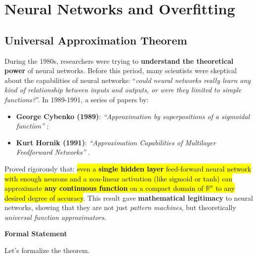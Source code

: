 \section{Neural Networks and Overfitting}

\subsection{Universal Approximation Theorem}

During the 1980s, researchers were trying to \textbf{understand the theoretical power} of neural networks. Before this period, many scientists were skeptical about the capabilities of neural networks: ``\emph{could neural networks really learn any kind of relationship between inputs and outputs, or were they limited to simple functions?}''. In 1989-1991, a series of papers by:
\begin{itemize}
    \item \textbf{George Cybenko (1989)}: \emph{``Approximation by superpositions of a sigmoidal function''} \cite{cybenko1989approximation};
    \item \textbf{Kurt Hornik (1991)}: \emph{``Approximation Capabilities of Multilayer Feedforward Networks''} \cite{hornik1991approximation}.
\end{itemize}
Proved rigorously that: \hl{even a \textbf{single hidden layer} feed-forward neural network with enough neurons and a non-linear activation (like sigmoid or tanh) can approximate \textbf{any continuous function} on a compact domain of $\mathbb{R}^n$ to any desired degree of accuracy}. This result gave \textbf{mathematical legitimacy} to neural networks, showing that they are not just \emph{pattern machines}, but theoretically \emph{universal function approximators}.

\highspace
\begin{flushleft}
    \textcolor{Green3}{ \textbf{Formal Statement}}
\end{flushleft}
Let's formalize the theorem.

